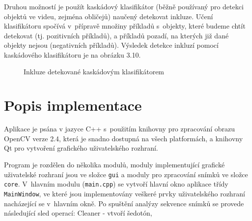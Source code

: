 \documentclass[12pt, a4paper]{report}
\begin{document}
Druhou možností je použít kaskádový klasifikátor (běžně používaný pro detekci objektů ve videu, zejména obličejů) naučený detekovat inkluze. Učení klasifikátoru spočívá v~přípravě množiny příkladů s~objekty, které budeme chtít detekovat (tj. pozitivních příkladů), a příkladů pozadí, na kterých již dané objekty nejsou (negativních příkladů). Výsledek detekce inkluzí pomocí kaskádového klasifikátoru je na obrázku 3.10.

\begin{figure}[!htb]
	\centering
	\label{fig:klasifikator}
	\caption{Inkluze detekované kaskádovým klasifikátorem}
	\end{figure}

\chapter{Popis implementace}
Aplikace je psána v jazyce C++ s~použitím knihovny pro zpracování obrazu OpenCV verze 2.4, která je snadno dostupná na všech platformách, a knihovny Qt pro vytvoření grafického uživatelského rozhraní.
	
	Program je rozdělen do několika modulů, moduly implementující grafické uživatelské rozhraní jsou ve složce \texttt{gui} a moduly pro zpracování snímků ve složce \texttt{core}. V~hlavním modulu (\texttt{main.cpp}) se vytvoří hlavní okno aplikace třídy \texttt{MainWindow}, ve které jsou implementovány veškeré prvky uživatelského rozhraní nacházející se v~hlavním okně. Po spuštění analýzy sekvence snímků se provede následující sled operací: Cleaner - vtvoří šedotón, 
\end{document}
